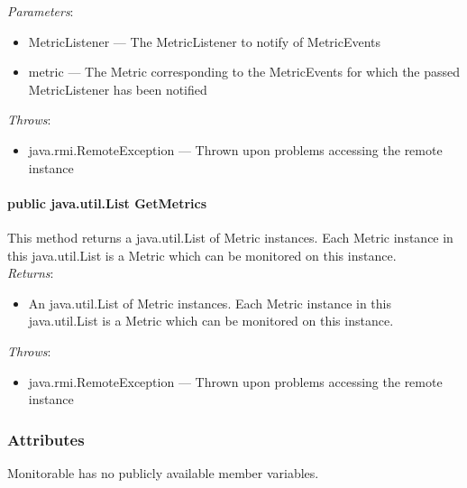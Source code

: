 \documentclass[$Date: 2003/06/26 19:29:31 $]{glabarticle}
\begin{document}
 \textit{Parameters}:
 \begin{itemize}
 \item[] MetricListener --- The MetricListener to notify of MetricEvents
 \item[] metric --- The Metric corresponding to the MetricEvents for which the passed MetricListener has been
 notified
 \end{itemize}
 
 \textit{Throws}:
 \begin{itemize}
 \item[] java.rmi.RemoteException --- Thrown upon problems accessing the remote instance 
 \end{itemize}
  
 \paragraph{public java.util.List GetMetrics}
 
 This method returns a java.util.List of Metric instances. Each Metric instance
 in this java.util.List is a Metric which can be monitored on this instance. \\
 
  \textit{Returns}:
 \begin{itemize}
 \item[] An java.util.List of Metric instances. Each Metric instance in this java.util.List is a Metric which can be
 monitored on this instance.
 \end{itemize} 
 
 \textit{Throws}:
 \begin{itemize}
 \item[] java.rmi.RemoteException --- Thrown upon problems accessing the remote instance 
 \end{itemize}
 

\subsubsection{Attributes}

Monitorable has no publicly available member variables. 


\newpage
\end{document}
